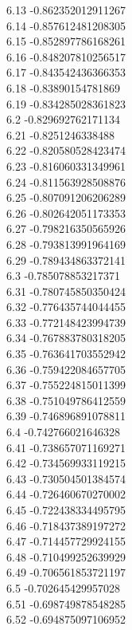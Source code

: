{6.13	-0.862352012911267\\
6.14	-0.857612481208305\\
6.15	-0.852897786168261\\
6.16	-0.848207810256517\\
6.17	-0.843542436366353\\
6.18	-0.83890154781869\\
6.19	-0.834285028361823\\
6.2	-0.829692762171134\\
6.21	-0.8251246338488\\
6.22	-0.820580528423474\\
6.23	-0.816060331349961\\
6.24	-0.811563928508876\\
6.25	-0.807091206206289\\
6.26	-0.802642051173353\\
6.27	-0.798216350565926\\
6.28	-0.793813991964169\\
6.29	-0.789434863372141\\
6.3	-0.785078853217371\\
6.31	-0.780745850350424\\
6.32	-0.776435744044455\\
6.33	-0.772148423994739\\
6.34	-0.767883780318205\\
6.35	-0.763641703552942\\
6.36	-0.759422084657705\\
6.37	-0.755224815011399\\
6.38	-0.751049786412559\\
6.39	-0.746896891078811\\
6.4	-0.742766021646328\\
6.41	-0.738657071169271\\
6.42	-0.734569933119215\\
6.43	-0.730504501384574\\
6.44	-0.726460670270002\\
6.45	-0.722438334495795\\
6.46	-0.718437389197272\\
6.47	-0.714457729924155\\
6.48	-0.710499252639929\\
6.49	-0.706561853721197\\
6.5	-0.702645429957028\\
6.51	-0.698749878548285\\
6.52	-0.694875097106952\\
}
